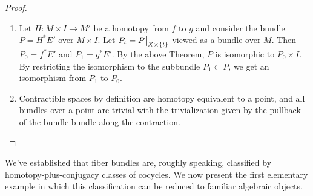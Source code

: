 \begin{proof}
\begin{enumerate}
    \item Let $H:M\times I\to M'$ be a homotopy from $f$ to $g$ and consider the bundle $P=H^\ast E'$ over $M\times I$. Let $P_t=\restr{P}{X\times\{t\}}$ viewed as a bundle over $M$. Then $P_0=f^\ast E'$ and $P_1=g^\ast E'$. By the above Theorem, $P$ is isomorphic to $P_0\times I$. By restricting the isomorphism to the subbundle $P_1\subset P$, we get an isomorphism from $P_1$ to $P_0$.
    \item Contractible spaces by definition are homotopy equivalent to a point, and all bundles over a point are trivial with the trivialization given by the pullback of the bundle bundle along the contraction.
\end{enumerate}
\end{proof}


We've established that fiber bundles are, roughly speaking, classified by homotopy-plus-conjugacy classes of cocycles. We now present the first elementary example in which this classification can be reduced to familiar algebraic objects.

